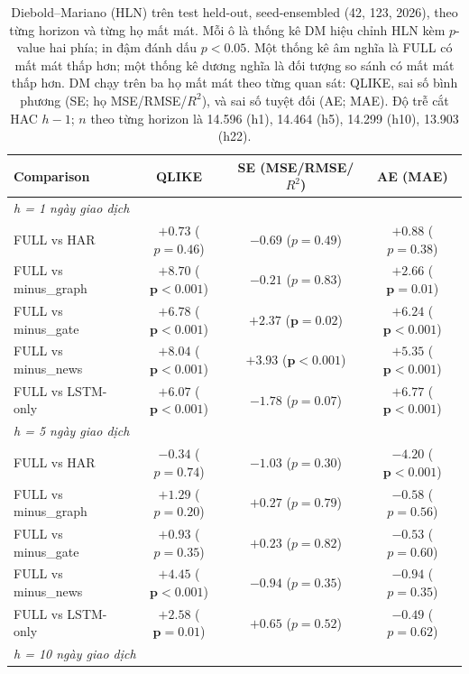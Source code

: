 \documentclass[runningheads]{llncs}
\begin{document}
\begin{table}[t]
\caption{Diebold--Mariano (HLN) trên test held-out, seed-ensembled (42, 123, 2026), theo từng horizon và
từng họ mất mát. Mỗi ô là thống kê DM hiệu chỉnh HLN kèm $p$-value hai phía; in đậm đánh dấu $p<0.05$.
Một thống kê âm nghĩa là FULL có mất mát thấp hơn; một thống kê dương nghĩa là đối tượng so sánh có mất
mát thấp hơn. DM chạy trên ba họ mất mát theo từng quan sát: QLIKE, sai số bình phương (SE; họ
MSE/RMSE/$R^2$), và sai số tuyệt đối (AE; MAE). Độ trễ cắt HAC $h{-}1$; $n$ theo từng horizon là 14.596
(h1), 14.464 (h5), 14.299 (h10), 13.903 (h22).}
\label{tab:dm}
\centering
\begin{tabular}{lccc}
\toprule
Comparison & QLIKE & SE (MSE/RMSE/$R^2$) & AE (MAE) \\
\midrule
\multicolumn{4}{l}{\textit{h = 1 ngày giao dịch}}\\
FULL vs HAR         & $+0.73$ ($p = 0.46$) & $-0.69$ ($p = 0.49$) & $+0.88$ ($p = 0.38$) \\
FULL vs minus\_graph & $\mathbf{+8.70}$ ($\mathbf{p<0.001}$) & $-0.21$ ($p = 0.83$) & $\mathbf{+2.66}$ ($\mathbf{p = 0.01}$) \\
FULL vs minus\_gate  & $\mathbf{+6.78}$ ($\mathbf{p<0.001}$) & $\mathbf{+2.37}$ ($\mathbf{p = 0.02}$) & $\mathbf{+6.24}$ ($\mathbf{p<0.001}$) \\
FULL vs minus\_news  & $\mathbf{+8.04}$ ($\mathbf{p<0.001}$) & $\mathbf{+3.93}$ ($\mathbf{p<0.001}$) & $\mathbf{+5.35}$ ($\mathbf{p<0.001}$) \\
FULL vs LSTM-only   & $\mathbf{+6.07}$ ($\mathbf{p<0.001}$) & $-1.78$ ($p = 0.07$) & $\mathbf{+6.77}$ ($\mathbf{p<0.001}$) \\
\midrule
\multicolumn{4}{l}{\textit{h = 5 ngày giao dịch}}\\
FULL vs HAR         & $-0.34$ ($p = 0.74$) & $-1.03$ ($p = 0.30$) & $\mathbf{-4.20}$ ($\mathbf{p<0.001}$) \\
FULL vs minus\_graph & $+1.29$ ($p = 0.20$) & $+0.27$ ($p = 0.79$) & $-0.58$ ($p = 0.56$) \\
FULL vs minus\_gate  & $+0.93$ ($p = 0.35$) & $+0.23$ ($p = 0.82$) & $-0.53$ ($p = 0.60$) \\
FULL vs minus\_news  & $\mathbf{+4.45}$ ($\mathbf{p<0.001}$) & $-0.94$ ($p = 0.35$) & $-0.94$ ($p = 0.35$) \\
FULL vs LSTM-only   & $\mathbf{+2.58}$ ($\mathbf{p = 0.01}$) & $+0.65$ ($p = 0.52$) & $-0.49$ ($p = 0.62$) \\
\midrule
\multicolumn{4}{l}{\textit{h = 10 ngày giao dịch}}\\

\end{tabular}
\end{table}
\end{document}
